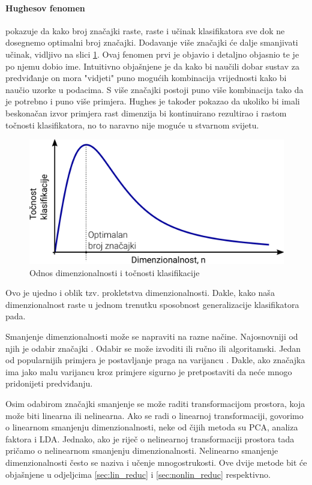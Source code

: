 \documentclass[times, utf8, diplomski]{fer}
\begin{document}
\paragraph{Hughesov fenomen}
pokazuje da kako broj značajki raste, raste i učinak klasifikatora sve dok ne dosegnemo optimalni broj značajki. Dodavanje više značajki će dalje smanjivati učinak, vidljivo na slici \ref{fig:hughes}. Ovaj fenomen prvi je objavio i detaljno objasnio \cite{hughes1968mean} te je po njemu dobio ime. Intuitivno objašnjene je da kako bi naučili dobar sustav za predviđanje on mora "vidjeti" puno mogućih kombinacija vrijednosti kako bi naučio uzorke u podacima. S više značajki postoji puno više kombinacija tako da je potrebno i puno više primjera. Hughes je također pokazao da ukoliko bi imali beskonačan izvor primjera rast dimenzija bi kontinuirano rezultirao i rastom točnosti klasifikatora, no to naravno nije moguće u stvarnom svijetu.
\begin{figure}[htb]
    \centering
    \includegraphics[width=12cm]{resources/images/reduction/hughes.png}
    \caption{Odnos dimenzionalnosti i točnosti klasifikacije}
    \label{fig:hughes}
\end{figure}

Ovo je ujedno i oblik tzv. prokletstva dimenzionalnosti. Dakle, kako naša dimenzionalnost raste u jednom trenutku sposobnost generalizacije klasifikatora pada.

\bigskip
Smanjenje dimenzionalnosti može se napraviti na razne načine. Najosnovniji od njih je odabir značajki . Odabir se može izvoditi ili ručno ili algoritamski. Jedan od popularnijih primjera je postavljanje praga na varijancu . Dakle, ako značajka ima jako malu varijancu kroz primjere sigurno je pretpostaviti da neće mnogo pridonijeti predviđanju.

\medskip
Osim odabirom značajki smanjenje se može raditi transformacijom prostora, koja može biti linearna ili nelinearna. Ako se radi o linearnoj transformaciji, govorimo o linearnom smanjenju dimenzionalnosti, neke od čijih metoda su PCA, analiza faktora  i LDA. Jednako, ako je riječ o nelinearnoj transformaciji prostora tada pričamo o nelinearnom smanjenju dimenzionalnosti. Nelinearno smanjenje dimenzionalnosti često se naziva i učenje mnogostrukosti. Ove dvije metode bit će objašnjene u odjeljcima \ref{sec:lin_reduc} i \ref{sec:nonlin_reduc} respektivno.
\end{document}
